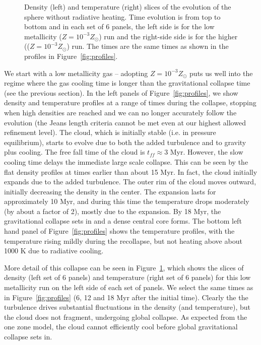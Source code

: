 \documentclass[useAMS,usenatbib]{mn2e}
\begin{document}
\begin{figure}
\begin{center}
\end{center}
\caption{\label{fig:number_density_panel} Density (left) and temperature (right) slices of the evolution of the sphere without radiative heating.  Time evolution is from top to bottom and in each set of 6 panels, the left side is for the low metallicity ($Z=10^{-3}Z_\odot$) run and the right-side side is for the higher (($Z=10^{-3}Z_\odot$) run.  The times are the same times as shown in the profiles in Figure~\ref{fig:profiles}.  }
\end{figure}


We start with a low metallicity gas -- adopting $Z=10^{-3}Z_\odot$ puts us well into the regime
where the gas cooling time is longer than the gravitational collapse time (see the previous section).
In the left panels of Figure~\ref{fig:profiles}, we show density and temperature profiles at a range of times during
the collapse, stopping when high densities are reached and we can no longer accurately follow the evolution
(the Jeans length criteria cannot be met even at our highest allowed refinement level).  
The cloud, which is initially stable (i.e. in pressure equilibrium), starts to evolve due to both the added
turbulence and to gravity plus cooling. The free fall time of the cloud is $t_{ff}\approx 3$ Myr.
However, the slow cooling time delays the immediate large scale collapse.
This can be seen by the flat density profiles at times earlier than about 15 Myr. 
In fact, the cloud initially expands due to the added turbulence. The outer rim
of the cloud moves outward, initially decreasing the density in the center.
The expansion lasts for approximately 10 Myr, and during this time the temperature drops moderately
(by about a factor of 2), mostly due to the expansion.  By 18 Myr, the gravitational
collapse sets in and a dense central core forms.   The bottom left hand panel of Figure~\ref{fig:profiles}
shows the temperature profiles, with the temperature rising mildly during the recollapse, but
not heating above about 1000 K due to radiative cooling.

More detail of this collapse can be seen in Figure~\ref{fig:number_density_panel}, which shows the slices of density (left set of 6 panels) and temperature (right set of 6 panels) for this low metallicity run on the left side of each set of panels.  We select the same times as in Figure~\ref{fig:profiles} (6, 12 and 18 Myr after the initial time).  Clearly the the turbulence drives substantial fluctuations in the density (and temperature), but the cloud does not fragment, undergoing global collapse.   As expected from the one zone model, the cloud cannot efficiently cool before global gravitational collapse sets in.
\end{document}
